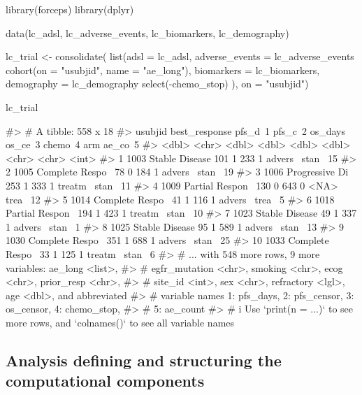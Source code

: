 \begin{Schunk}
\begin{Sinput}
library(forceps)
library(dplyr)

data(lc_adsl, lc_adverse_events, lc_biomarkers, lc_demography)

lc_trial <- consolidate(
  list(adsl = lc_adsl,
       adverse_events = lc_adverse_events %
         cohort(on = "usubjid", name = "ae_long"),
       biomarkers = lc_biomarkers,
       demography = lc_demography %
         select(-chemo_stop)
  ),
  on = "usubjid")

lc_trial
\end{Sinput}
\begin{Soutput}
#> # A tibble: 558 x 18
#>    usubjid best_response   pfs_d~1 pfs_c~2 os_days os_ce~3 chemo~4 arm   ae_co~5
#>      <dbl> <chr>             <dbl>   <dbl>   <dbl>   <dbl> <chr>   <chr>   <int>
#>  1    1003 Stable Disease      101       1     233       1 advers~ stan~      15
#>  2    1005 Complete Respo~      78       0     184       1 advers~ stan~      19
#>  3    1006 Progressive Di~     253       1     333       1 treatm~ stan~      11
#>  4    1009 Partial Respon~     130       0     643       0 <NA>    trea~      12
#>  5    1014 Complete Respo~      41       1     116       1 advers~ trea~       5
#>  6    1018 Partial Respon~     194       1     423       1 treatm~ stan~      10
#>  7    1023 Stable Disease       49       1     337       1 advers~ stan~       1
#>  8    1025 Stable Disease       95       1     589       1 advers~ stan~      13
#>  9    1030 Complete Respo~     351       1     688       1 advers~ stan~      25
#> 10    1033 Complete Respo~      33       1     125       1 treatm~ stan~       6
#> # ... with 548 more rows, 9 more variables: ae_long <list>,
#> #   egfr_mutation <chr>, smoking <chr>, ecog <chr>, prior_resp <chr>,
#> #   site_id <int>, sex <chr>, refractory <lgl>, age <dbl>, and abbreviated
#> #   variable names 1: pfs_days, 2: pfs_censor, 3: os_censor, 4: chemo_stop,
#> #   5: ae_count
#> # i Use `print(n = ...)` to see more rows, and `colnames()` to see all variable names
\end{Soutput}
\end{Schunk}

\hypertarget{analysis-defining-and-structuring-the-computational-components}{%
\subsection{Analysis defining and structuring the computational
components}\label{analysis-defining-and-structuring-the-computational-components}}

